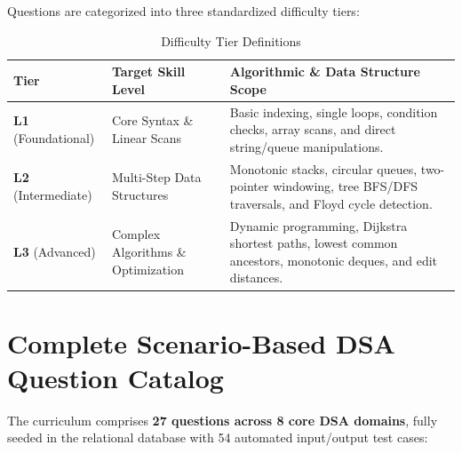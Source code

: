 \documentclass[12pt, a4paper]{report}
\begin{document}
Questions are categorized into three standardized difficulty tiers:
\begin{table}[H]
\centering
\caption{Difficulty Tier Definitions}
\renewcommand{\arraystretch}{1.2}
\small
\begin{tabular}{|L{3.0cm}|L{4.2cm}|L{8.3cm}|}
\hline
{}
\color{white}\textbf{Tier} & \color{white}\textbf{Target Skill Level} & \color{white}\textbf{Algorithmic \& Data Structure Scope} \\
\hline
\textbf{L1} (Foundational) & Core Syntax \& Linear Scans & Basic indexing, single loops, condition checks, array scans, and direct string/queue manipulations. \\
\hline
{}
\textbf{L2} (Intermediate) & Multi-Step Data Structures & Monotonic stacks, circular queues, two-pointer windowing, tree BFS/DFS traversals, and Floyd cycle detection. \\
\hline
\textbf{L3} (Advanced) & Complex Algorithms \& Optimization & Dynamic programming, Dijkstra shortest paths, lowest common ancestors, monotonic deques, and edit distances. \\
\hline
\end{tabular}
\end{table}

\section{Complete Scenario-Based DSA Question Catalog}
The curriculum comprises \textbf{27 questions across 8 core DSA domains}, fully seeded in the relational database with 54 automated input/output test cases:
\end{document}
